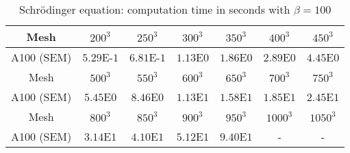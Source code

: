 \begin{table}[ht!]
    \centering
    \begin{tabular}{|c|c|c|c|c|c|c|}
    \hline
          Mesh & $200^3$ & $250^3$ & $300^3$ & $350^3$ & $400^3$ & $450^3$\\
    \hline
         A100 (SEM) & $5.29$E-$1$ & $6.81$E-$1$ & $1.13$E$0$ & $1.86$E$0$ & $2.89$E$0$ & $4.45$E$0$\\
    \hline
    \hline
         Mesh & $500^3$ & $550^3$ & $600^3$ & $650^3$ & $700^3$ & $750^3$\\
    \hline
         A100 (SEM) & $5.45$E$0$ & $8.46$E$0$ & $1.13$E$1$ & $1.58$E$1$ & $1.85$E$1$ & $2.45$E$1$\\
    \hline
    \hline
         Mesh & $800^3$ & $850^3$ & $900^3$ & $950^3$ & $1000^3$ & $1050^3$\\
    \hline
         A100 (SEM) & $3.14$E$1$ & $4.10$E$1$ & $5.12$E$1$ & $9.40$E$1$ & - & -\\
    \hline
    \end{tabular}
    \caption{Schr{\"o}dinger equation: computation time in seconds with $\beta = 100$}
    \label{tab6: GPU_schrodinger_beta100}
\end{table}

